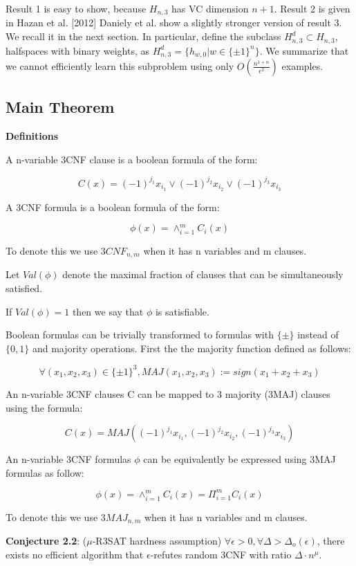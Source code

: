 \documentclass[11pt,a4paper]{article}
\begin{document}
Result 1 is easy to show, because $H_{n, 3}$ has VC dimension $n + 1$.
Result 2 is given in Hazan et al. [2012] Daniely et al. show a slightly stronger version of result 3. We recall it in the next section. In particular, define the subclass $H_{n, 3}^d \subset H_{n, 3}$, halfspaces with binary weights, as $H_{n, 3}^d = \{h_{w, 0} | w \in \{\pm 1\}^n\}$. We summarize that we cannot efficiently learn this subproblem using only $O(\frac{n^{1 + \alpha}}{\epsilon^2})$ examples.

\subsection{Main Theorem}

\textbf{Definitions}

A n-variable 3CNF clause is a boolean formula of the form:

$$C(x) = (-1)^{j_1}x_{i_1} \vee (-1)^{j_2}x_{i_2} \vee (-1)^{j_3}x_{i_3} $$

A 3CNF formula is a boolean formula of the form:

$$ \phi(x) = \wedge^m_{i=1} C_{i}(x) $$

To denote this we use $3CNF_{n,m}$ when it has n variables and m clauses.

Let $Val(\phi)$ denote the maximal fraction of clauses that can be simultaneously satisfied.

If $Val(\phi) =  1$ then we say that $\phi$ is satisfiable.

Boolean formulas can be trivially transformed to formulas with $\{ \pm \}$ instead of $\{ 0,1 \}$ and majority operations.
First the the majority function defined as follows:

$$\forall (x_1, x_2, x_3) \in \{ \pm 1 \}^3, MAJ(x_1, x_2, x_3 ) := sign(x_1 + x_2 + x_3 )$$

An n-variable 3CNF clauses C can be mapped to 3 majority (3MAJ) clauses using the formula:

$$ C(x) = MAJ( (-1)^{j_1}x_{i_1} , (-1)^{j_2}x_{i_2} , (-1)^{j_3}x_{i_3} )$$

An n-variable 3CNF formulas $\phi$ can be equivalently be expressed using 3MAJ formulas as follow:

$$ \phi(x) = \wedge^m_{i=1} C_{i}(x)  = \Pi^m_{i=1} C_{i}(x) $$

To denote this we use $3MAJ_{n,m}$ when it has n variables and m clauses.

\textbf{Conjecture 2.2}: ($\mu$-R3SAT hardness assumption) $\forall \epsilon > 0, \forall \Delta > \Delta_o(\epsilon) $, there exists no efficient algorithm that $\epsilon$-refutes random 3CNF with ratio $\Delta \cdot n^{\mu}$.
\end{document}
